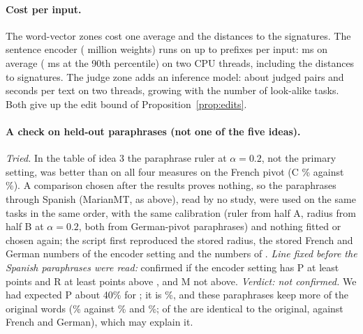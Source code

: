 \paragraph{Cost per input.} The word-vector zones cost one average and the distances to the signatures. The sentence encoder (\WidenEncParams{} million weights) runs on up to \WidenEncPrefixes{} prefixes per input: \WidenEncMs{} ms on average (\WidenEncMsHigh{} ms at the 90th percentile) on two CPU threads, including the distances to \WidenTasksEval{} signatures. The judge zone adds an inference model: about \WidenJudgePairs{} judged pairs and \WidenJudgeSeconds{} seconds per text on two threads, growing with the number of look-alike tasks. Both give up the edit bound of Proposition~\ref{prop:edits}.

\paragraph{A check on held-out paraphrases (not one of the five ideas).} \emph{Tried.} In the table of idea 3 the paraphrase ruler at $\alpha = 0.2$, not the primary setting, was better than \cert{} on all four measures on the French pivot (\textsf{C} \WidenSpC{}\% against \WidenSpCRule{}\%). A comparison chosen after the results proves nothing, so the paraphrases through Spanish (MarianMT, as above), read by no study, were used on the same \WidenTasksEval{} tasks in the same order, with the same calibration (ruler from half A, radius from half B at $\alpha = 0.2$, both from German-pivot paraphrases) and nothing fitted or chosen again; the script first reproduced the stored radius, the stored French and German numbers of the encoder setting and the numbers of \cert{}.
\emph{Line fixed before the Spanish paraphrases were read:} confirmed if the encoder setting has \textsf{P} at least \WidenSpAskP{} points and \textsf{R} at least \WidenSpAskR{} points above \cert{}, and \textsf{M} not above. \emph{Verdict: not confirmed.} We had expected \textsf{P} about 40\% for \cert{}; it is \WidenRefTfiveEsP{}\%, and these paraphrases keep more of the original words (\WidenSpKept{}\% against \WidenKeptDe{}\% and \WidenKeptFr{}\%; \WidenSpSame{} of the \WidenTasksAll{} are identical to the original, against \WidenSameFr{} French and \WidenSameDe{} German), which may explain it.
